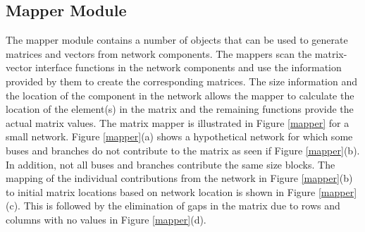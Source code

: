 \documentclass[preprint]{acm_proc_article-sp}
\begin{document}
\subsection{Mapper Module}
The mapper module contains a number of objects that can be used to generate
matrices and vectors from network components. The mappers scan the matrix-vector
interface functions in the network components and use the information provided
by them to create the corresponding matrices. The size information and the
location of the component in the network allows the mapper to calculate the
location of the element(s) in the matrix and the remaining functions provide the
actual matrix values. The matrix mapper is illustrated in Figure \ref{mapper}
for a small network.
Figure \ref{mapper}(a) shows a hypothetical network for which some buses and
branches do not contribute to the matrix as seen if Figure \ref{mapper}(b).
In addition, not all buses and branches contribute
the same size blocks. The mapping of the individual contributions from the
network in Figure \ref{mapper}(b) to initial matrix locations based on network
location is shown in Figure \ref{mapper}(c). This is followed by the elimination
of gaps in the matrix due to rows and columns with no values in Figure
\ref{mapper}(d).
\end{document}
